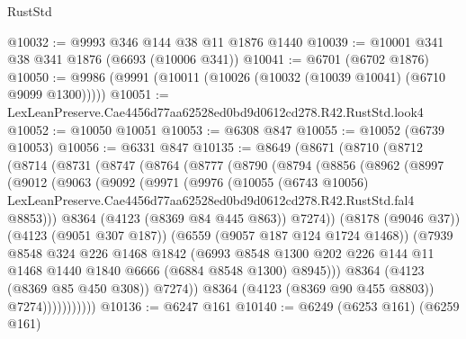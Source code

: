 \begin{lexlean}{RustStd}
\begin{coremodule}
@10032 := @9993 @346 @144 @38 @11 @1876 @1440
@10039 := @10001 @341 @38 @341 @1876 (@6693 (@10006 @341))
@10041 := @6701 (@6702 @1876)
@10050 := @9986 (@9991 (@10011 (@10026 (@10032 (@10039 @10041) (@6710 @9099 @1300)))))
@10051 := LexLeanPreserve.Cae4456d77aa62528ed0bd9d0612cd278.R42.RustStd.look4
@10052 := @10050 @10051
@10053 := @6308 @847
@10055 := @10052 (@6739 @10053)
@10056 := @6331 @847
@10135 := @8649
    (@8671
      (@8710
        (@8712
          (@8714
            (@8731
              (@8747
                (@8764
                  (@8777
                    (@8790
                      (@8794
                        (@8856
                          (@8962
                            (@8997
                              (@9012
                                (@9063
                                  (@9092
                                    (@9971
                                      (@9976
                                        (@10055
                                          (@6743 @10056)
                                          LexLeanPreserve.Cae4456d77aa62528ed0bd9d0612cd278.R42.RustStd.fal4
                                          @8853)))
                                    @8364
                                    (@4123 (@8369 @84 @445 @863))
                                    @7274))
                                (@8178 (@9046 @37))
                                (@4123 (@9051 @307 @187))
                                (@6559 (@9057 @187 @124 @1724 @1468))
                                (@7939
                                  @8548
                                  @324
                                  @226
                                  @1468
                                  @1842
                                  (@6993
                                    @8548
                                    @1300
                                    @202
                                    @226
                                    @144
                                    @11
                                    @1468
                                    @1440
                                    @1840
                                    @6666
                                    (@6884 @8548 @1300)
                                    @8945)))
                              @8364
                              (@4123 (@8369 @85 @450 @308))
                              @7274))
                          @8364
                          (@4123 (@8369 @90 @455 @8803))
                          @7274)))))))))))
@10136 := @6247 @161
@10140 := @6249 (@6253 @161) (@6259 @161)

\end{coremodule}
\end{lexlean}
